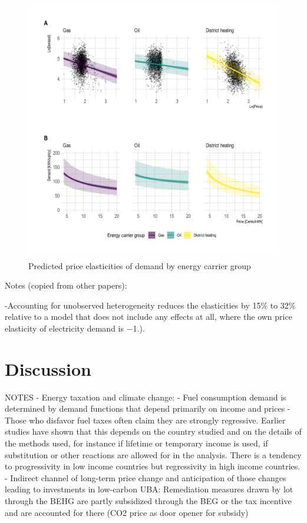 \documentclass[12pt,twoside]{reedthesis}
\begin{document}
\begin{figure}

{\centering \includegraphics[width=1.04\linewidth]{figure/elasticity_predictions_subsample} 

}

\caption{Predicted price elasticities of demand by energy carrier group}\label{fig:elasticity-predictions-energy-carrier}
\end{figure}
Notes (copied from other papers):

-Accounting for unobserved heterogeneity reduces the elasticities by 15\% to 32\% relative to a model that does not include any effects at all, where the own price elasticity of electricity demand is −1.).

\hypertarget{discussion}{%
\chapter{Discussion}\label{discussion}}

NOTES - Energy taxation and climate change:
- Fuel consumption demand is determined by demand functions that depend primarily on income and prices
- Those who disfavor fuel taxes often claim they are strongly regressive. Earlier studies have shown that this depends on the country studied and on the details of the methods used, for instance if lifetime or temporary income is used, if substitution or other reactions are allowed for in the analysis. There is a tendency to progressivity in low income countries but regressivity in high income countries.
- Indirect channel of long-term price change and anticipation of those changes leading to investments in low-carbon UBA: Remediation measures drawn by lot through the BEHG are partly subsidized through the BEG or the tax incentive and are accounted for there (CO2 price as door opener for subsidy)
\end{document}
